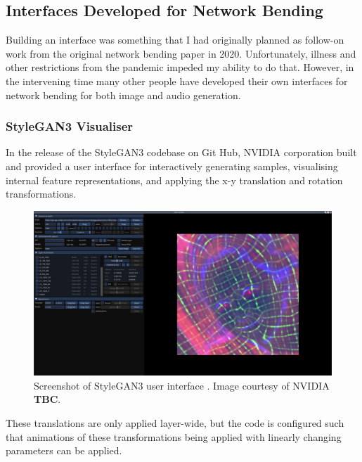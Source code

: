 \subsection{Interfaces Developed for Network Bending}
\label{c7:subsec:net-bend-interfaces}

Building an interface was something that I had originally planned as follow-on work from the original network bending paper in 2020. 
Unfortunately, illness and other restrictions from the pandemic impeded my ability to do that. 
However, in the intervening time many other people have developed their own interfaces for network bending for both image and audio generation.

\subsubsection{StyleGAN3 Visualiser}

In the release of the StyleGAN3 codebase on Git Hub, NVIDIA corporation built and provided a user interface for interactively generating samples, visualising internal feature representations, and applying the x-y translation and rotation transformations. 

\begin{figure}[!htb]
    \centering
    \captionsetup{justification=centering}
    \includegraphics[width=1\textwidth]{figures/c7_impact/net-bend-technical/stylegan3-vis-interface.png}
    \caption[StyleGAN3 user interface]{Screenshot of StyleGAN3 user interface \citep{karras2021alias}. Image courtesy of NVIDIA \textbf{TBC}.}
    \label{fig:c7:stylegan3-interface}
\end{figure}


These translations are only applied layer-wide, but the code is configured such that animations of these transformations being applied with linearly changing parameters can be applied. 

